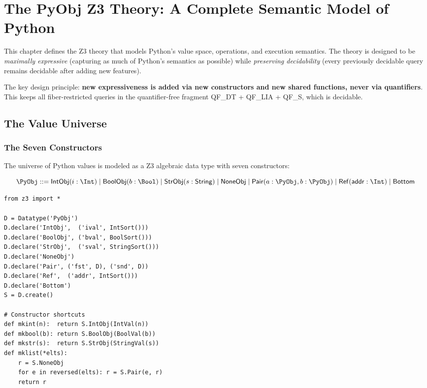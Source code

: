 
\chapter{The PyObj Z3 Theory: A Complete Semantic Model of Python}
\label{ch:pyobj}

This chapter defines the Z3 theory that models Python's value space,
operations, and execution semantics.  The theory is designed to be
\emph{maximally expressive} (capturing as much of Python's semantics
as possible) while \emph{preserving decidability} (every previously
decidable query remains decidable after adding new features).

The key design principle: \textbf{new expressiveness is added via
new constructors and new shared functions, never via quantifiers}.
This keeps all fiber-restricted queries in the quantifier-free
fragment QF\_DT + QF\_LIA + QF\_S, which is decidable.

\section{The Value Universe}

\subsection{The Seven Constructors}

The universe of Python values is modeled as a Z3 algebraic data type
with seven constructors:

\begin{definition}
\[
\PyObj ::=
  \mathsf{IntObj}(i : \Int) \mid
  \mathsf{BoolObj}(b : \Bool) \mid
  \mathsf{StrObj}(s : \mathsf{String}) \mid
  \mathsf{NoneObj} \mid
  \mathsf{Pair}(a : \PyObj, b : \PyObj) \mid
  \mathsf{Ref}(\mathsf{addr} : \Int) \mid
  \mathsf{Bottom}
\]
\end{definition}

\begin{lstlisting}[caption={PyObj ADT: complete Z3 implementation}]
from z3 import *

D = Datatype('PyObj')
D.declare('IntObj',  ('ival', IntSort()))
D.declare('BoolObj', ('bval', BoolSort()))
D.declare('StrObj',  ('sval', StringSort()))
D.declare('NoneObj')
D.declare('Pair', ('fst', D), ('snd', D))
D.declare('Ref',  ('addr', IntSort()))
D.declare('Bottom')
S = D.create()

# Constructor shortcuts
def mkint(n):  return S.IntObj(IntVal(n))
def mkbool(b): return S.BoolObj(BoolVal(b))
def mkstr(s):  return S.StrObj(StringVal(s))
def mklist(*elts):
    r = S.NoneObj
    for e in reversed(elts): r = S.Pair(e, r)
    return r
\end{lstlisting}

